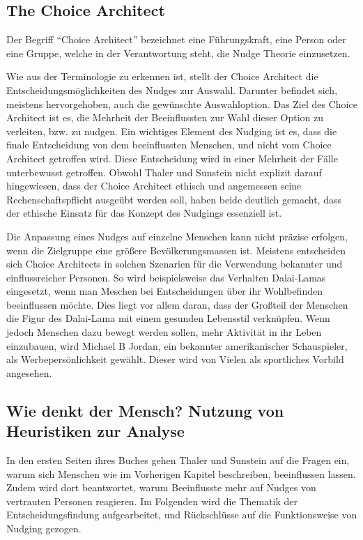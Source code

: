 \subsection{The Choice Architect}
Der Begriff “Choice Architect” bezeichnet eine Führungskraft, eine Person oder eine Gruppe, welche in der Verantwortung steht, die Nudge Theorie einzusetzen.

Wie aus der Terminologie zu erkennen ist, stellt der Choice Architect die Entscheidungsmöglichkeiten des Nudges zur Auswahl. Darunter befindet sich, meistens hervorgehoben, auch die gewünschte Auswahloption. Das Ziel des Choice Architect ist es, die Mehrheit der Beeinflussten zur Wahl dieser Option zu verleiten, bzw. zu nudgen. Ein wichtiges Element des Nudging ist es, dass die finale Entscheidung von dem beeinflussten Menschen, und nicht vom Choice Architect getroffen wird. Diese Entscheidung wird in einer Mehrheit der Fälle unterbewusst getroffen. Obwohl Thaler und Sunstein nicht explizit darauf hingewiesen, dass der Choice Architect ethisch und angemessen seine Rechenschaftspflicht ausgeübt werden soll, haben beide deutlich gemacht, dass der ethische Einsatz für das Konzept des Nudgings essenziell ist.

Die Anpassung eines Nudges auf einzelne Menschen kann nicht präzise erfolgen, wenn die Zielgruppe eine größere Bevölkerungsmassen ist. Meistens entscheiden sich Choice Architects in solchen Szenarien für die Verwendung bekannter und einflussreicher Personen. So wird beispielsweise das Verhalten Dalai-Lamas eingesetzt, wenn man Meschen bei Entscheidungen über ihr Wohlbefinden beeinflussen möchte. Dies liegt vor allem daran, dass der Großteil der Menschen die Figur des Dalai-Lama mit einem gesunden Lebensstil verknüpfen. Wenn jedoch Menschen dazu bewegt werden sollen, mehr Aktivität in ihr Leben einzubauen, wird Michael B Jordan, ein bekannter amerikanischer Schauspieler, als Werbepersönlichkeit gewählt. Dieser wird von Vielen als sportliches Vorbild angesehen.

\subsection{Wie denkt der Mensch? Nutzung von Heuristiken zur Analyse}
In den ersten Seiten ihres Buches gehen Thaler und Sunstein auf die Fragen ein, warum sich Menschen wie im Vorherigen Kapitel beschreiben, beeinflussen lassen. Zudem wird dort beantwortet, warum Beeinflusste mehr auf Nudges von vertrauten Personen reagieren. Im Folgenden wird die Thematik der Entscheidungsfindung aufgearbeitet, und Rückschlüsse auf die Funktionsweise von Nudging gezogen.

